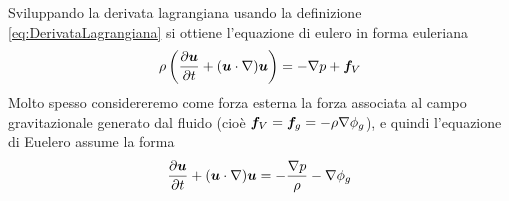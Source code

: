 Sviluppando la derivata lagrangiana usando la definizione  \ref{eq:DerivataLagrangiana} si ottiene l'equazione di eulero in forma euleriana
\begin{equation}
\rho \left(\frac{\partial \V{u}}{\partial t} + (\V{u} \cdot \V{\nabla})\V{u} \right) = - \V{\nabla}p + \V{f}_V
\end{equation}
Molto spesso considereremo come forza esterna la forza associata al campo gravitazionale generato dal fluido (cioè $\V{f}_V = \V{f}_g = -\rho \V{\nabla}\phi_g$), e quindi l'equazione di Euelero assume la forma
\begin{equation}
\frac{\partial \V{u}}{\partial t} + (\V{u} \cdot \V{\nabla})\V{u}  = - \frac{\V{\nabla}p}{\rho} - \V{\nabla}\phi_g \label{eq:EuleroEuleriana}
\end{equation}

